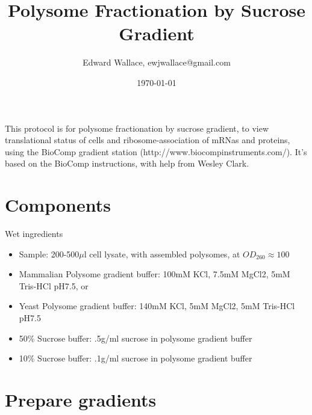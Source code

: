 \documentclass{article}
\newcommand{\mul}{\ensuremath{\mu}l }
\begin{document}
\title{Polysome Fractionation by Sucrose Gradient}
\author{Edward Wallace, ewjwallace@gmail.com}
\date{\today}
\maketitle

This protocol is for polysome fractionation by sucrose gradient, to view translational status of cells and ribosome-association of mRNas and proteins, using the BioComp gradient station (http://www.biocompinstruments.com/). It's based on the BioComp instructions, with help from Wesley Clark.

\section{Components}

Wet ingredients
\begin{itemize}
\item Sample: 200-500\mul cell lysate, with assembled polysomes, at $OD_{260} \approx 100 $
\item Mammalian Polysome gradient buffer: 100mM KCl, 7.5mM MgCl2, 5mM Tris-HCl pH7.5, or
\item Yeast Polysome gradient buffer: 140mM KCl, 5mM MgCl2, 5mM Tris-HCl pH7.5
\item 50\% Sucrose buffer: .5g/ml sucrose in polysome gradient buffer
\item 10\% Sucrose buffer: .1g/ml sucrose in polysome gradient buffer
\end{itemize}



\section{Prepare gradients}
\end{document}
